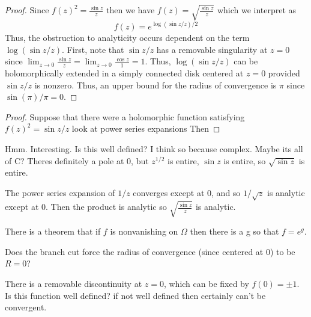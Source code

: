 \documentclass{article}
\begin{document}
\begin{enumerate}
	\begin{proof}
		Since $f(z)^2 = \frac{\sin z}{z}$ then we have $f(z) = \sqrt{\frac{\sin z}{z}}$ which we interpret as
		\[ f(z) = e^{ \log (\sin z/z)/2 } \]
		Thus, the obstruction to analyticity occurs dependent on the term $\log(\sin z/z)$.
		First, note that $\sin z/z$ has a removable singularity at $z=0$ since
		$\lim_{z \rightarrow 0}\frac{\sin z}{z} = \lim_{z \rightarrow 0} \frac{\cos z}{1} = 1$. Thus, $\log(\sin z/z)$ can be holomorphically extended in a simply connected disk centered at $z=0$ provided $\sin z/z$ is nonzero. Thus, an upper bound for the radius of convergence is $\pi$ since $\sin (\pi)/\pi = 0$.
	\end{proof}
	
	\begin{proof}
		Suppose that there were a holomorphic function satisfying $f(z)^2 = \sin z /z $ look at power series expansions
		Then %
	\end{proof}
		
	Hmm. Interesting. Is this well defined? I think so because complex.
	Maybe its all of C? Theres definitely a pole at $0$, but $z^{1/2}$ is entire, $\sin z$ is entire, so $\sqrt{\sin z}$ is entire.
	
	The power series expansion of $1/z$ converges except at $0$, and so $1/\sqrt{z}$ is analytic except at $0$. Then the product is analytic so $\sqrt{\frac{\sin z}{z}}$ is analytic. 
	
	There is a theorem that if $f$ is nonvanishing on $\Omega$ then there is a g so that $f = e^g$.
	
	Does the branch cut force the radius of convergence (since centered at $0$) to be $R=0$?
	
	There is a removable discontinuity at $z=0$, which can be fixed by $f(0) = \pm 1$. Is this function well defined? if not well defined then certainly can't be convergent.
\end{enumerate}
\end{document}
